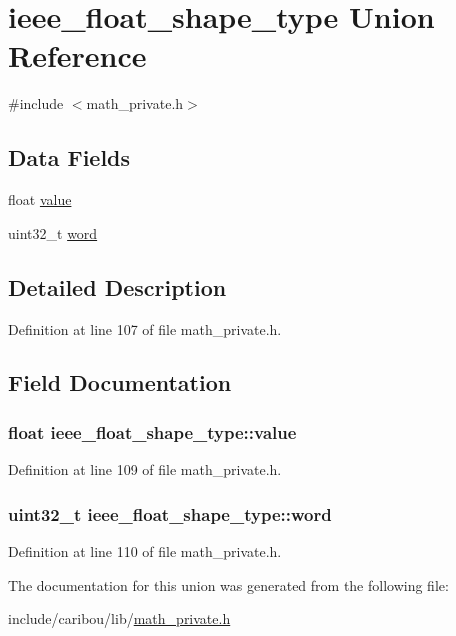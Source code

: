 \hypertarget{unionieee__float__shape__type}{\section{ieee\-\_\-float\-\_\-shape\-\_\-type Union Reference}
\label{unionieee__float__shape__type}
}


{\ttfamily \#include $<$math\-\_\-private.\-h$>$}

\subsection*{Data Fields}
\begin{DoxyCompactItemize}
\item 
float \hyperlink{unionieee__float__shape__type_aa0c47451f1b974421cbb9e2833ddb68e}{value}
\item 
uint32\-\_\-t \hyperlink{unionieee__float__shape__type_adb70a477cb0179659bb95dc6b1870b80}{word}
\end{DoxyCompactItemize}


\subsection{Detailed Description}


Definition at line 107 of file math\-\_\-private.\-h.



\subsection{Field Documentation}
\hypertarget{unionieee__float__shape__type_aa0c47451f1b974421cbb9e2833ddb68e}{
\subsubsection[{value}]{\setlength{\rightskip}{0pt plus 5cm}float ieee\-\_\-float\-\_\-shape\-\_\-type\-::value}}\label{unionieee__float__shape__type_aa0c47451f1b974421cbb9e2833ddb68e}


Definition at line 109 of file math\-\_\-private.\-h.

\hypertarget{unionieee__float__shape__type_adb70a477cb0179659bb95dc6b1870b80}{
\subsubsection[{word}]{\setlength{\rightskip}{0pt plus 5cm}uint32\-\_\-t ieee\-\_\-float\-\_\-shape\-\_\-type\-::word}}\label{unionieee__float__shape__type_adb70a477cb0179659bb95dc6b1870b80}


Definition at line 110 of file math\-\_\-private.\-h.



The documentation for this union was generated from the following file\-:\begin{DoxyCompactItemize}
\item 
include/caribou/lib/\hyperlink{math__private_8h}{math\-\_\-private.\-h}\end{DoxyCompactItemize}
